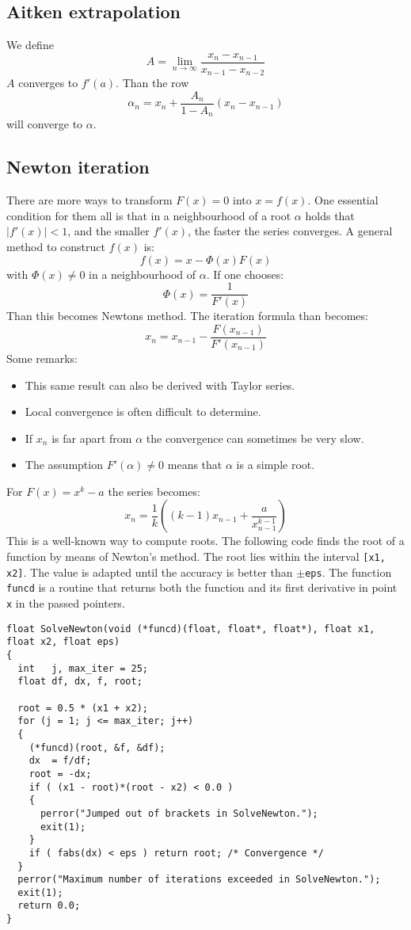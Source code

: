 \subsection{Aitken extrapolation}
We define
\[
A=\lim_{n\rightarrow\infty}\frac{x_n-x_{n-1}}{x_{n-1}-x_{n-2}}
\]
$A$ converges to $f'(a)$. Than the row
\[
\alpha_n=x_n+\frac{A_n}{1-A_n}(x_n-x_{n-1})
\]
will converge to $\alpha$.

\subsection{Newton iteration}
There are more ways to transform $F(x)=0$ into $x=f(x)$. One essential
condition for them all is that in a neighbourhood of a root $\alpha$ holds
that $|f'(x)|<1$, and the smaller $f'(x)$, the faster the series converges.
A general method to construct $f(x)$ is:
\[
f(x)=x-\Phi(x)F(x)
\]
with $\Phi(x)\neq0$ in a neighbourhood of $\alpha$. If one chooses:
\[
\Phi(x)=\frac{1}{F'(x)}
\]
Than this becomes Newtons method. The iteration formula than becomes:
\[
x_n=x_{n-1}-\frac{F(x_{n-1})}{F'(x_{n-1})}
\]
Some remarks:
\begin{itemize}
\item This same result can also be derived with Taylor series.
\item Local convergence is often difficult to determine.
\item If $x_n$ is far apart from $\alpha$ the convergence can sometimes be very slow.
\item The assumption $F'(\alpha)\neq0$ means that $\alpha$ is a simple root.
\end{itemize}
For $F(x)=x^k-a$ the series becomes:
\[
x_n=\frac{1}{k}\left((k-1)x_{n-1}+\frac{a}{x_{n-1}^{k-1}}\right)
\]
This is a well-known way to compute roots.
\npar
The following code finds the root of a function by means of Newton's method. The
root lies within the interval {\tt [x1, x2]}. The value is adapted until the
accuracy is better than {\tt$\pm$eps}. The function {\tt funcd} is a routine
that returns both the function and its first derivative in point {\tt x} in the
passed pointers.
\begin{verbatim}
float SolveNewton(void (*funcd)(float, float*, float*), float x1, float x2, float eps)
{
  int   j, max_iter = 25;
  float df, dx, f, root;

  root = 0.5 * (x1 + x2);
  for (j = 1; j <= max_iter; j++)
  {
    (*funcd)(root, &f, &df);
    dx  = f/df;
    root = -dx;
    if ( (x1 - root)*(root - x2) < 0.0 )
    {
      perror("Jumped out of brackets in SolveNewton.");
      exit(1);
    }
    if ( fabs(dx) < eps ) return root; /* Convergence */
  }
  perror("Maximum number of iterations exceeded in SolveNewton.");
  exit(1);
  return 0.0;
}
\end{verbatim}

